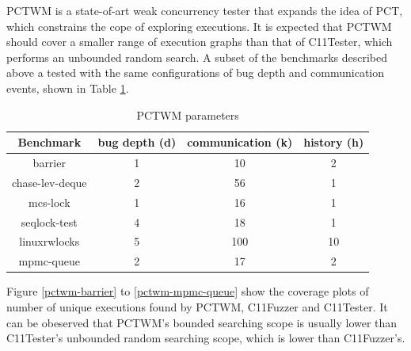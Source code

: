 PCTWM \cite{pctwm} is a state-of-art weak concurrency tester that expands the idea of PCT, which constrains the cope of exploring executions. It is expected that PCTWM should cover a smaller range of execution graphs than that of C11Tester, which performs an unbounded random search. A subset of the benchmarks described above a tested with the same configurations of bug depth and communication events, shown in Table \ref{pctwm-configs}.

\begin{table}[h]
	\centering
	\begin{tabular}{ |c|ccc| }
		\hline
		Benchmark       & bug depth (d) & communication (k) & history (h) \\
		\hline
		barrier         & 1             & 10                & 2           \\
		chase-lev-deque & 2             & 56                & 1           \\
		mcs-lock        & 1             & 16                & 1           \\
		seqlock-test    & 4             & 18                & 1           \\
		linuxrwlocks    & 5             & 100               & 10          \\
		mpmc-queue      & 2             & 17                & 2           \\
		\hline
	\end{tabular}
	\caption{PCTWM parameters}
	\label{pctwm-configs}
\end{table}

Figure \ref{pctwm-barrier} to \ref{pctwm-mpmc-queue} show the coverage plots of number of unique executions found by PCTWM, C11Fuzzer and C11Tester. It can be obeserved that PCTWM's bounded searching scope is usually lower than C11Tester's unbounded random searching scope, which is lower than C11Fuzzer's.

